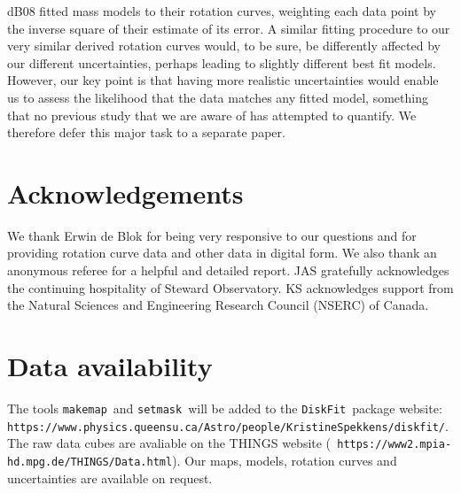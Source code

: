 \documentclass[letterpaper,fleqn,usenatbib]{mnras}
\def\etal{{\it et al.}}
\def\DFt{{\tt DiskFit}}
\def\mkm{{\tt makemap}}
\def\smk{{\tt setmask}}
\begin{document}
dB08 fitted mass models to their rotation curves, weighting each data
point by the inverse square of their estimate of its error.  A similar
fitting procedure to our very similar derived rotation curves would,
to be sure, be differently affected by our different uncertainties,
perhaps leading to slightly different best fit models.  However, our
key point is that having more realistic uncertainties would enable us
to assess the likelihood that the data matches any fitted model,
something that no previous study that we are aware of has attempted to
quantify.  We therefore defer this major task to a separate paper.

\section*{Acknowledgements}
We thank Erwin de Blok for being very responsive to our questions and
for providing rotation curve data and other data in digital form. We
also thank an anonymous referee for a helpful and detailed report.
JAS gratefully acknowledges the continuing hospitality of Steward
Observatory. KS acknowledges support from the Natural Sciences and
Engineering Research Council (NSERC) of Canada.

\section*{Data availability}
The tools \mkm\ and \smk\ will be added to the \DFt\ package website:
{\tt
  https://www.physics.queensu.ca/Astro/people\-/Kristine\underline{\phantom{a}}Spekkens/diskfit/}.
The raw data cubes are avaliable on the THINGS website ({\tt
  https://www2.mpia-hd.mpg.de/THINGS/Data.html}).  Our maps, models,
rotation curves and uncertainties are available on request.

\def\skip#1{ \etal\ }
\def\PhD{PhD thesis.}
\def\pnas{{\it Proc.\ Nat.\ Acad.\ Sci.\ (USA)}}
\end{document}

